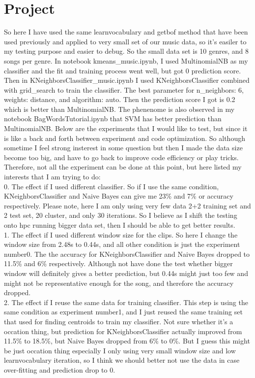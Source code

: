 \documentclass[final]{siamltexmm}
\begin{document}
\section{Project}
So here I have used the same learnvocabulary and getbof method that have been used previously and applied to very small set of our music data, so it's easiler to my testing purpose and easier to debug. So the small data set is 10 genres, and 8 songs per genre. In notebook kmeans\_music.ipynb, I used MultinomialNB as my classifier and the fit and training process went well, but got 0 prediction score. Then in KNeighborsClassifier\_music.ipynb I used KNeighborsClassifier combined with grid\_search to train the classifier. The best parameter for n\_neighbors: 6, weights: distance, and algorithm: auto. Then the prediction score I got is 0.2 which is better than MultinomialNB. The phenenome is also observed in my notebook BagWordsTutorial.ipynb that SVM has better prediction than MultinomialNB. Below are the experiments that I would like to test, but since it is like a back and forth between experiment and code optimization. So although sometime I feel strong insterest in some question but then I made the data size become too big, and have to go back to improve code efficiency or play tricks. Therefore, not all the experiment can be done at this point, but here listed my interests that I am trying to do:
\\ 0. The effect if I used different classifier. So if I use the same condition, KNeighborsClassifier and Naive Bayes can give me 23\% and 7\% or accuracy respectively. Please note, here I am only using very few data 2+2 training set and 2 test set, 20 cluster, and only 30 iterations. So I believe as I shift the testing onto hpc running bigger data set, then I should be able to get better results.
\\ 1. The effect if I used different window size for the clips. So here I change the window size from 2.48s to 0.44s, and all other condition is just the experiment number0. The the accuracy for KNeighborsClassifier and Naive Bayes dropped to 11.5\% and 6\% respectively. Although not have done the test whether bigger window will definitely gives a better prediction, but 0.44s might just too few and might not be representative enough for the song, and therefore the accuracy dropped.
\\ 2. The effect if I reuse the same data for training classifier. This step is using the same condition as experiment number1, and I just reused the same training set that used for finding centroids to train my classifier. Not sure whether it's a occation thing, but prediction for KNeighborsClassifier actually improved from 11.5\% to 18.5\%, but Naive Bayes dropped from 6\% to 0\%. But I guess this might be just occation thing especially I only using very small window size and low learnvocabulary iteration, so I think we should better not use the data in case over-fitting and prediction drop to 0.
\end{document}
